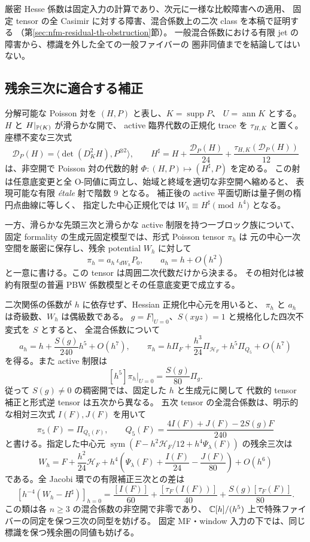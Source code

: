 厳密 Hesse 係数は固定入力の計算であり、次元に一様な比較障害への適用、
固定 tensor の全 Casimir に対する障害、混合係数上の二次 class を本稿で証明する
（第\ref{sec:nfm-residual-th-obstruction}節）。
一般混合係数における有限 jet の障害から、標識を外した全ての一般ファイバーの
圏非同値までを結論してはいない。


\subsection{残余三次に適合する補正}

\begin{maintheorem}[代数的補正と形式的な残余比較]
分解可能な Poisson 対を $(H,P)$ と表し、$K=\operatorname{supp}P$、
$U=\operatorname{ann}K$ とする。$H$ と $H|_{\mathbb P(K)}$ が滑らかな開で、
active 臨界代数の正規化 trace を $\tau_{H,K}$ と置く。
座標不変な三次式
\[
 \mathcal D_P(H)=\langle\det(D_K^2H),P^{\otimes2}\rangle,
 \qquad H^\sharp=H+\frac{\mathcal D_P(H)}{24}
                      +\frac{\tau_{H,K}(\mathcal D_P(H))}{12}
\]
は、非空開で Poisson 対の代数的射 $\Phi:(H,P)\mapsto(H^\sharp,P)$ を定める。
この射は任意底変更と全 O-同値に両立し、始域と終域を適切な非空開へ縮めると、
表現可能な有限 \emph{\'etale} 射で階数 $9$ となる。
補正後の active 平面切断は量子側の楕円点曲線に等しく、
指定した中心正規化では $W_h\equiv H^\sharp\pmod{h^4}$ となる。

一方、滑らかな先頭三次と滑らかな active 制限を持つ一ブロック族について、
固定 formality の生成元固定模型では、形式 Poisson tensor $\pi_h$ は
元の中心一次空間を厳密に保存し、残余 potential $W_h$ に対して
\[
 \pi_h=a_h\,\iota_{dW_h}P_0,\qquad a_h=h+O(h^2)
\]
と一意に書ける。この tensor は周囲二次代数だけから決まる。
その相対化は被約有限型の普遍 PBW 係数模型とその任意底変更で成立する。

二次関係の係数が $h$ に依存せず、Hessian 正規化中心元を用いると、
$\pi_h$ と $a_h$ は奇級数、$W_h$ は偶級数である。
$g=F|_{U=0}$、$S(xyz)=1$ と規格化した四次不変式を $S$ とすると、
全混合係数について
\[
a_h=h+\frac{S(g)}{240}h^5+O(h^7),\qquad
 \pi_h=h\Pi_F+\frac{h^3}{24}\Pi_{\mathscr H_F}
                 +h^5\Pi_{Q_5}+O(h^7)
\]
を得る。また active 制限は
\[
 [h^5]\pi_h|_{U=0}=\frac{S(g)}{80}\Pi_g.
\]
従って $S(g)\ne0$ の稠密開では、固定した $h$ と生成元に関して
代数的 tensor 補正と形式逆 tensor は五次から異なる。
五次 tensor の全混合係数は、明示的な相対三次式 $I(F),J(F)$ を用いて
\[
 \pi_5(F)=\Pi_{Q_5(F)},\qquad
 Q_5(F)=\frac{4I(F)+J(F)-2S(g)F}{240}
\]
と書ける。指定した中心元
$\operatorname{sym}(F-h^2\mathscr H_F/12+h^4\Psi_\lambda(F))$ の残余三次は
\[
 W_h=F+\frac{h^2}{24}\mathscr H_F
       +h^4\left(\Psi_\lambda(F)+\frac{I(F)}{24}-\frac{J(F)}{80}\right)+O(h^6)
\]
である。全 Jacobi 環での有限補正三次との差は
\[
 [h^{-4}(W_h-H^\sharp)]_{h=0}
 =\frac{[I(F)]}{60}+\frac{[\tau_F(I(F))]}{40}
                      +\frac{S(g)[\tau_F(F)]}{80}.
\]
この類は各 $n\ge3$ の混合係数の非空開で非零であり、
$\mathbb C[h]/(h^5)$ 上で特殊ファイバーの同定を保つ三次の同型を妨げる。
固定 MF・window 入力の下では、同じ標識を保つ残余圏の同値も妨げる。


\end{maintheorem}
